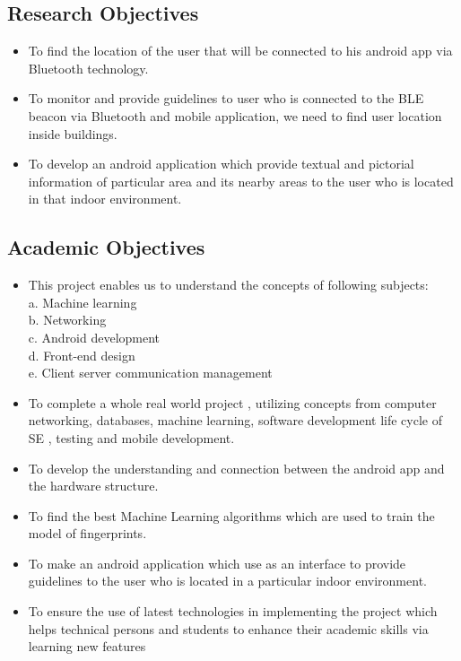 \documentclass{article}
\begin{document}
\subsection{Research Objectives}
\begin{itemize}
\item To find the location of the user that will be connected to his android app via Bluetooth technology.\cite{Introduction}
\item To monitor and provide guidelines to user who is connected to the BLE beacon via Bluetooth and mobile application, we need to find user location inside buildings.
\item To develop an android application which provide textual and pictorial information of particular area and its nearby areas to the user who is located in that indoor environment.


\end{itemize}
\subsection{Academic Objectives}
\begin{itemize}
\item This project enables us to understand the concepts of following subjects:
\\a.	Machine learning
\\b.	Networking
\\c.	Android development
\\d.	Front-end design
\\e.	Client server communication management
\item To complete a whole real world project , utilizing concepts from computer networking, databases, machine learning, software development life cycle of SE , testing and mobile development.
\item To develop the understanding and connection between the android app and the hardware structure. 
\item To find the best Machine Learning algorithms which are used to train the model of fingerprints. 
\item To make an android application which use as an interface to provide guidelines to the user who is located in a particular indoor environment.
\item To ensure the use of latest technologies in implementing the project which helps technical persons and students to enhance their academic skills via learning new features


\end{itemize}
\end{document}
